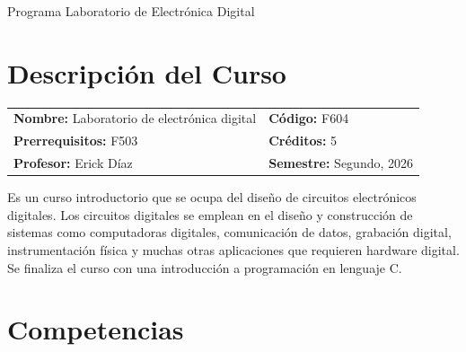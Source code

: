 \documentclass{article}
\begin{document}
\bigskip

\bigskip
\centerline{\Large Programa Laboratorio de Electrónica Digital}
\section{Descripción del Curso}
\begin{tabular}{ll}
{\bf Nombre:} Laboratorio de electrónica digital & {\bf Código:} F604\\
{\bf Prerrequisitos:} F503  & {\bf Créditos:} 5\\
{\bf Profesor:} Erick Díaz & {\bf Semestre:} Segundo, 2026\\
\end{tabular}
\bigskip

Es un curso introductorio que se ocupa del diseño de circuitos electrónicos digitales. Los circuitos digitales
se emplean en el diseño y construcción de sistemas como computadoras digitales, comunicación de datos, grabación digital, instrumentación
física y muchas otras aplicaciones que requieren hardware digital. Se finaliza el curso con una introducción a programación en lenguaje C.
\section{Competencias}
\end{document}
